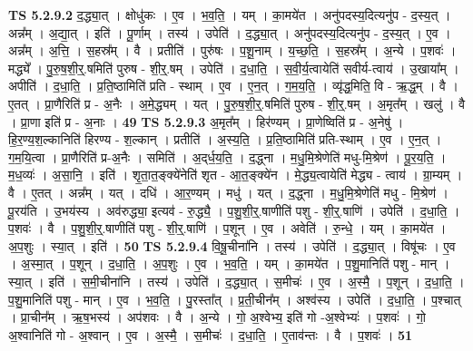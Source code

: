 \documentclass[17pt]{extarticle}
\begin{document}
                  \newline
                                \textbf{ TS 5.2.9.2} \newline
                  द॒द्ध्या॒त् । क्षोधु॑कः । ए॒व । भ॒व॒ति॒ । यम् । का॒मये॑त । अनु॑पदस्य॒दित्यनु॑प - द॒स्य॒त् । अन्न᳚म् । अ॒द्या॒त् । इति॑ । पू॒र्णाम् । तस्य॑ । उपेति॑ । द॒द्ध्या॒त् । अनु॑पदस्य॒दित्यनु॑प - द॒स्य॒त् । ए॒व । अन्न᳚म् । अ॒त्ति॒ । स॒हस्र᳚म् । वै । प्रतीति॑ । पुरु॑षः । प॒शू॒नाम् । य॒च्छ॒ति॒ । स॒हस्र᳚म् । अ॒न्ये । प॒शवः॑ । मद्ध्ये᳚ । पु॒रु॒ष॒शी॒र्॒.षमिति॑ पुरुष - शी॒र्॒.षम् । उपेति॑ । द॒धा॒ति॒ । स॒वी॒र्य॒त्वायेति॑ सवीर्य-त्वाय॑ । उ॒खाया᳚म् । अपीति॑ । द॒धा॒ति॒ । प्र॒ति॒ष्ठामिति॑ प्रति - स्थाम् । ए॒व । ए॒न॒त् । ग॒म॒य॒ति॒ । व्यृ॑द्ध॒मिति॒ वि - ऋ॒द्ध॒म् । वै । ए॒तत् । प्रा॒णैरिति॑ प्र - अ॒नैः । अ॒मे॒द्ध्यम् । यत् । पु॒रु॒ष॒शी॒र्॒.षमिति॑ पुरुष - शी॒र्॒.षम् । अ॒मृत᳚म् । खलु॑ । वै । प्रा॒णा इति॑ प्र - अ॒नाः । \textbf{  49} \newline
                  \newline
                                \textbf{ TS 5.2.9.3} \newline
                  अ॒मृत᳚म् । हिर॑ण्यम् । प्रा॒णेष्विति॑ प्र - अ॒नेषु॑ । हि॒र॒ण्य॒श॒ल्कानिति॑ हिरण्य - श॒ल्कान् । प्रतीति॑ । अ॒स्य॒ति॒ । प्र॒ति॒ष्ठामिति॑ प्रति-स्थाम् । ए॒व । ए॒न॒त् । ग॒म॒यि॒त्वा । प्रा॒णैरिति॑ प्र-अ॒नैः । समिति॑ । अ॒द्‌र्ध॒य॒ति॒ । द॒द्ध्ना । म॒धु॒मि॒श्रेणेति॑ मधु-मि॒श्रेण॑ । पू॒र॒य॒ति॒ । म॒ध॒व्यः॑ । अ॒सा॒नि॒ । इति॑ । शृ॒ता॒त॒ङ्क्ये॑नेति॑ शृत - आ॒त॒ङ्क्ये॑न । मे॒द्ध्य॒त्वायेति॑ मेद्ध्य - त्वाय॑ । ग्रा॒म्यम् । वै । ए॒तत् । अन्न᳚म् । यत् । दधि॑ । आ॒र॒ण्यम् । मधु॑ । यत् । द॒द्ध्ना । म॒धु॒मि॒श्रेणेति॑ मधु - मि॒श्रेण॑ । पू॒रय॑ति । उ॒भय॑स्य । अव॑रुद्ध्या॒ इत्यव॑ - रु॒द्ध्यै॒ । प॒शु॒शी॒र्॒.षाणीति॑ पशु - शी॒र्॒.षाणि॑ । उपेति॑ । द॒धा॒ति॒ । प॒शवः॑ । वै । प॒शु॒शी॒र्॒.षाणीति॑ पशु - शी॒र्॒.षाणि॑ । प॒शून् । ए॒व । अवेति॑ । रु॒न्धे॒ । यम् । का॒मये॑त । अ॒प॒शुः । स्या॒त् । इति॑ । \textbf{  50 } \newline
                  \newline
                                \textbf{ TS 5.2.9.4} \newline
                  वि॒षू॒चीना॑नि । तस्य॑ । उपेति॑ । द॒द्ध्या॒त् । विषू॑चः । ए॒व । अ॒स्मा॒त् । प॒शून् । द॒धा॒ति॒ । अ॒प॒शुः । ए॒व । भ॒व॒ति॒ । यम् । का॒मये॑त । प॒शु॒मानिति॑ पशु - मान् । स्या॒त् । इति॑ । स॒मी॒चीना॑नि । तस्य॑ । उपेति॑ । द॒द्ध्या॒त् । स॒मीचः॑ । ए॒व । अ॒स्मै॒ । प॒शून् । द॒धा॒ति॒ । प॒शु॒मानिति॑ पशु - मान् । ए॒व । भ॒व॒ति॒ । पु॒रस्ता᳚त् । प्र॒ती॒चीन᳚म् । अश्व॑स्य । उपेति॑ । द॒धा॒ति॒ । प॒श्चात् । प्रा॒चीन᳚म् । ऋ॒ष॒भस्य॑ । अप॑शवः । वै । अ॒न्ये । गो॒ अ॒श्वेभ्य॒ इति॑ गो -अ॒श्वेभ्यः॑ । प॒शवः॑ । गो॒ अ॒श्वानिति॑ गो - अ॒श्वान् । ए॒व । अ॒स्मै॒ । स॒मीचः॑ । द॒धा॒ति॒ । ए॒ताव॑न्तः । वै । प॒शवः॑ । \textbf{  51} \newline
\end{document}
